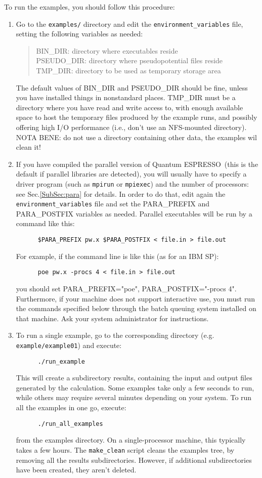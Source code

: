 \documentclass[12pt,a4paper]{article}
\def\qe{{\sc Quantum ESPRESSO}}
\begin{document}
To run the examples, you should follow this procedure:
\begin{enumerate}   
\item Go to the \texttt{examples/} directory and edit the 
  \texttt{environment\_variables} file, setting the following variables as needed: 
\begin{quote}
   BIN\_DIR: directory where executables reside\\
   PSEUDO\_DIR: directory where pseudopotential files reside\\
   TMP\_DIR: directory to be used as temporary storage area
\end{quote}
The default values of BIN\_DIR and PSEUDO\_DIR should be fine, 
unless you have installed things in nonstandard places. TMP\_DIR 
must be a directory where you have read and write access to, with 
enough available space to host the temporary files produced by the 
example runs, and possibly offering high I/O performance (i.e., don't 
use an NFS-mounted directory). NOTA BENE: do not use a
directory containing other data, the examples wil clean it!
\item If you have compiled the parallel version of \qe\ (this
is the default if parallel libraries are detected), you will usually
have to specify a driver program (such as \texttt{mpirun} or \texttt{mpiexec}) 
and the number of processors: see Sec.\ref{SubSec:para} for
details. In order to do that, edit again the \texttt{environment\_variables} 
file
and set the PARA\_PREFIX and PARA\_POSTFIX variables as needed. 
Parallel executables will be run by a command like this: 
\begin{verbatim}
      $PARA_PREFIX pw.x $PARA_POSTFIX < file.in > file.out
\end{verbatim}
For example, if the command line is like this (as for an IBM SP):
\begin{verbatim}
      poe pw.x -procs 4 < file.in > file.out
\end{verbatim}
you should set PARA\_PREFIX="poe", PARA\_POSTFIX="-procs
4". Furthermore, if your machine does not support interactive use, you
must run the commands specified below through the batch queuing
system installed on that machine. Ask your system administrator for
instructions. 
\item To run a single example, go to the corresponding directory (e.g.
 \texttt{example/example01}) and execute: 
\begin{verbatim}
      ./run_example
\end{verbatim}
This will create a subdirectory results, containing the input and
output files generated by the calculation. Some examples take only a
few seconds to run, while others may require several minutes depending
on your system. To run all the examples in one go, execute:
\begin{verbatim}
      ./run_all_examples
\end{verbatim}
from the examples directory. On a single-processor machine, this
typically takes a few hours. The \texttt{make\_clean} script cleans the
examples tree, by removing all the results subdirectories. However, if
additional subdirectories have been created, they aren't deleted. 


\end{enumerate}
\end{document}
